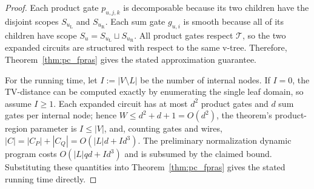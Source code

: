 \documentclass[10pt,a4paper]{amsart}
\begin{document}
\begin{proof}
Each product gate $p_{u,j,k}$ is decomposable because its two children have the disjoint scopes $S_{u_{\mathrm L}}$ and $S_{u_{\mathrm R}}$. Each sum gate $g_{u,i}$ is smooth because all of its children have scope $S_u=S_{u_{\mathrm L}}\sqcup S_{u_{\mathrm R}}$. All product gates respect $\mathcal T$, so the two expanded circuits are structured with respect to the same v-tree. Therefore, Theorem~\ref{thm:pc_fpras} gives the stated approximation guarantee.

For the running time, let $I:=|V\setminus L|$ be the number of internal nodes. If $I=0$, the TV-distance can be computed exactly by enumerating the single leaf domain, so assume $I\geq1$. Each expanded circuit has at most $d^2$ product gates and $d$ sum gates per internal node; hence $W\leq d^2+d+1=O(d^2)$, the theorem's product-region parameter is $I\leq|V|$, and, counting gates and wires, $|C|=|C_P|+|C_Q|=O(|L|d+Id^3)$. The preliminary normalization dynamic program costs $O(|L|qd+Id^3)$ and is subsumed by the claimed bound. Substituting these quantities into Theorem~\ref{thm:pc_fpras} gives the stated running time directly.
\end{proof}
\end{document}
